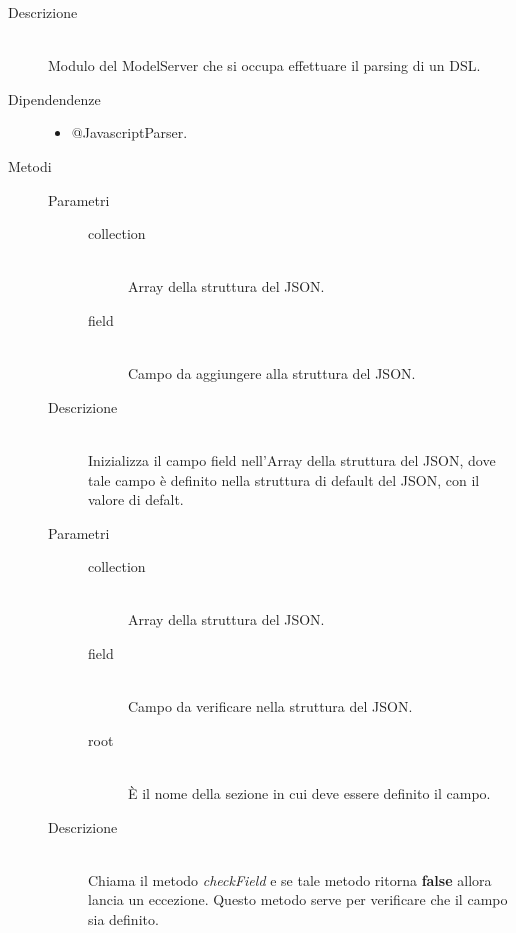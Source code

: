 \begin{description}
 \item[Descrizione] \hfill \\
  Modulo del ModelServer che si occupa effettuare il parsing di un DSL.
 \item[Dipendendenze] \hfill
 \begin{itemize}
  \item{@JavascriptParser}.
 \end{itemize}
  
 \item[Metodi]
 \begin{mldescription}
  \hfill 
 \begin{description}
     		\item[Parametri] \hfill
     			\begin{description}
     				\item[collection] \hfill \\
     				Array della struttura del JSON.
     				\item[field] \hfill \\
     				Campo da aggiungere alla struttura del JSON.
     			\end{description}
     		\item[Descrizione] \hfill \\
     		Inizializza il campo field nell'Array della struttura del JSON, dove tale campo è definito nella struttura di default del JSON, con il valore di defalt.
 \end{description}
 \hfill 
 \begin{description}
     		\item[Parametri] \hfill
     			\begin{description}
     				\item[collection] \hfill \\
     				Array della struttura del JSON.
     				\item[field] \hfill \\
     				Campo da verificare nella struttura del JSON.
     				\item[root] \hfill \\
     				\`{E} il nome della sezione in cui deve essere definito il campo.
     			\end{description}
     		\item[Descrizione] \hfill \\
     		Chiama il metodo \textit{checkField} e se tale metodo ritorna \textbf{false} allora lancia un eccezione. Questo metodo serve per verificare che il campo sia definito. 

\end{description}
\end{mldescription}
\end{description}
